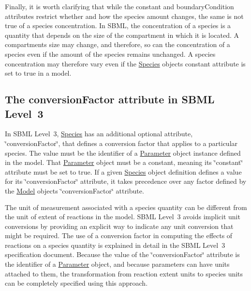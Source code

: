 Finally, it is worth clarifying that while the constant and boundary\+Condition attributes restrict whether and how the species amount changes, the same is not true of a species\textquotesingle{} concentration. In S\+B\+ML, the concentration of a species is a quantity that depends on the size of the compartment in which it is located. A compartment\textquotesingle{}s size may change, and therefore, so can the concentration of a species even if the amount of the species remains unchanged. A species\textquotesingle{} concentration may therefore vary even if the \hyperlink{class_species}{Species} object\textquotesingle{}s constant attribute is set to {\ttfamily true} in a model.\hypertarget{class_species_species-l2-convfactor}{}\subsection{The conversion\+Factor attribute in S\+B\+M\+L Level 3}\label{class_species_species-l2-convfactor}
In S\+B\+ML Level~3, \hyperlink{class_species}{Species} has an additional optional attribute, \char`\"{}conversion\+Factor\char`\"{}, that defines a conversion factor that applies to a particular species. The value must be the identifier of a \hyperlink{class_parameter}{Parameter} object instance defined in the model. That \hyperlink{class_parameter}{Parameter} object must be a constant, meaning its \char`\"{}constant\char`\"{} attribute must be set to {\ttfamily true}. If a given \hyperlink{class_species}{Species} object definition defines a value for its \char`\"{}conversion\+Factor\char`\"{} attribute, it takes precedence over any factor defined by the \hyperlink{class_model}{Model} object\textquotesingle{}s \char`\"{}conversion\+Factor\char`\"{} attribute.

The unit of measurement associated with a species\textquotesingle{} quantity can be different from the unit of extent of reactions in the model. S\+B\+ML Level~3 avoids implicit unit conversions by providing an explicit way to indicate any unit conversion that might be required. The use of a conversion factor in computing the effects of reactions on a species\textquotesingle{} quantity is explained in detail in the S\+B\+ML Level~3 specification document. Because the value of the \char`\"{}conversion\+Factor\char`\"{} attribute is the identifier of a \hyperlink{class_parameter}{Parameter} object, and because parameters can have units attached to them, the transformation from reaction extent units to species units can be completely specified using this approach.

